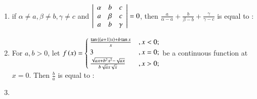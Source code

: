 \documentclass[journal]{IEEEtran}
\begin{document}
\begin{enumerate}[start=16]
\begin{enumerate}
\end{enumerate}
\item %
if $\alpha \neq a, \beta \neq b, \gamma \neq c$ and  
$\left\vert\begin{array}{ccc}
\alpha & b & c \\ a & \beta & c \\ a & b & \gamma \end{array}\right\vert =0 $, then $\frac{a}{\alpha - a}+\frac{b}{\beta - b}+\frac{\gamma}{\gamma - c}$ is equal to :
\begin{enumerate}
\end{enumerate}
\item %
For $a, b >0$,  let $f\left(x\right)= 
\begin{cases}
\frac{\tan{\ensuremath{\left(\left(a+1\right)x\right)}}+b\tan{x}}{x} &, x < 0; \\
3 &,  x = 0; \\
\frac{\sqrt{ax+b^2x^2} - \sqrt{ax}}{b\sqrt{a}x\sqrt{x}} &,  x>0;
\end{cases} $ 
be a continuous function at $x=0$. Then $\frac{b}{a}$ is equal to :
\begin{enumerate}
\end{enumerate}
\item %

\end{enumerate}
\end{document}
